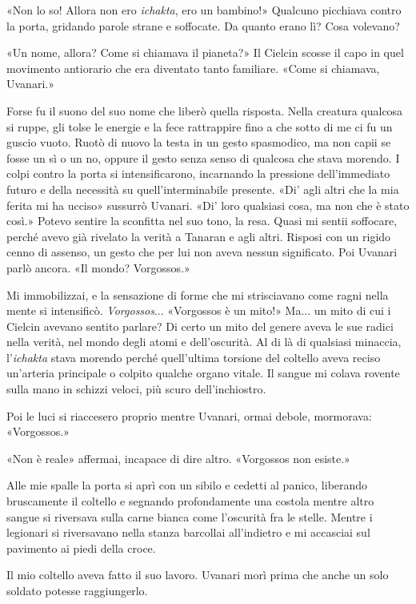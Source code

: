 «Non lo so! Allora non ero \emph{ichakta}, ero un bambino!» Qualcuno
picchiava contro la porta, gridando parole strane e soffocate. Da quanto
erano lì? Cosa volevano?

«Un nome, allora? Come si chiamava il pianeta?» Il Cielcin scosse il
capo in quel movimento antiorario che era diventato tanto familiare.
«Come si chiamava, Uvanari.»

Forse fu il suono del suo nome che liberò quella risposta. Nella
creatura qualcosa si ruppe, gli tolse le energie e la fece rattrappire
fino a che sotto di me ci fu un guscio vuoto. Ruotò di nuovo la testa in
un gesto spasmodico, ma non capii se fosse un sì o un no, oppure il
gesto senza senso di qualcosa che stava morendo. I colpi contro la porta
si intensificarono, incarnando la pressione dell'immediato futuro e
della necessità su quell'interminabile presente. «Di' agli altri che la
mia ferita mi ha ucciso» sussurrò Uvanari. «Di' loro qualsiasi cosa, ma
non che è stato così.» Potevo sentire la sconfitta nel suo tono, la
resa. Quasi mi sentii soffocare, perché avevo già rivelato la verità a
Tanaran e agli altri. Risposi con un rigido cenno di assenso, un gesto
che per lui non aveva nessun significato. Poi Uvanari parlò ancora. «Il
mondo? Vorgossos.»

Mi immobilizzai, e la sensazione di forme che mi strisciavano come ragni
nella mente si intensificò. \emph{Vorgossos}... «Vorgossos è un mito!»
Ma... un mito di cui i Cielcin avevano sentito parlare? Di certo un mito
del genere aveva le sue radici nella verità, nel mondo degli atomi e
dell'oscurità. Al di là di qualsiasi minaccia, l'\emph{ichakta} stava
morendo perché quell'ultima torsione del coltello aveva reciso
un'arteria principale o colpito qualche organo vitale. Il sangue mi
colava rovente sulla mano in schizzi veloci, più scuro dell'inchiostro.

Poi le luci si riaccesero proprio mentre Uvanari, ormai debole,
mormorava: «Vorgossos.»

«Non è reale» affermai, incapace di dire altro. «Vorgossos non esiste.»

Alle mie spalle la porta si aprì con un sibilo e cedetti al panico,
liberando bruscamente il coltello e segnando profondamente una costola
mentre altro sangue si riversava sulla carne bianca come l'oscurità fra
le stelle. Mentre i legionari si riversavano nella stanza barcollai
all'indietro e mi accasciai sul pavimento ai piedi della croce.

Il mio coltello aveva fatto il suo lavoro. Uvanari morì prima che anche
un solo soldato potesse raggiungerlo.


